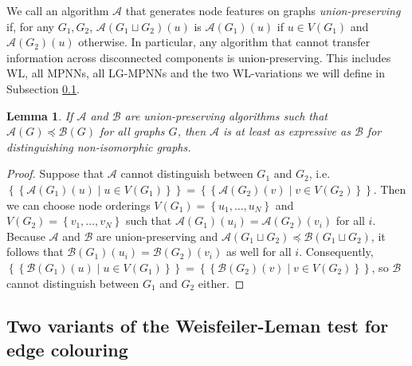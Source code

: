 \documentclass{article}
\newtheorem{lemma}[theorem]{Lemma}
\newcommand{\set}[1]{\left\{#1\right\}}
\newcommand{\multiset}[1]{\left\{\!\!\left\{#1\right\}\!\!\right\}}
\newcommand{\mca}{\mathcal{A}}
\newcommand{\mcb}{\mathcal{B}}
\begin{document}
We call an algorithm $\mca$ that generates node features on graphs \emph{union-preserving} if, for any $G_1,G_2$, $\mca(G_1 \sqcup G_2)(u)$ is $\mca(G_1)(u)$ if $u\in V(G_1)$ and $\mca(G_2)(u)$ otherwise.
In particular, any algorithm that cannot transfer information across disconnected components is union-preserving. This includes WL, all MPNNs, all LG-MPNNs and the two WL-variations we will define in Subsection \ref{ssec:wl-variations}.

\begin{lemma}   \label{lemma:refinement-distinguishability}
    If $\mca$ and $\mcb$ are union-preserving algorithms such that $\mca(G) \preceq \mcb(G)$ for all graphs $G$, then $\mca$ is at least as expressive as $\mcb$ for distinguishing non-isomorphic graphs.
\end{lemma}

\begin{proof}
    Suppose that $\mca$ cannot distinguish between $G_1$ and $G_2$, i.e. $\multiset{\mca(G_1)(u) \mid u\in V(G_1)} = \multiset{\mca(G_2)(v) \mid v\in V(G_2)}$. Then we can choose node orderings $V(G_1)=\set{u_1,\dots,u_N}$ and $V(G_2)=\set{v_1,\dots,v_N}$ such that $\mca(G_1)(u_i)=\mca(G_2)(v_i)$ for all $i$. Because $\mca$ and $\mcb$ are union-preserving and $\mca(G_1 \sqcup G_2) \preceq \mcb(G_1 \sqcup G_2)$, it follows that $\mcb(G_1)(u_i)=\mcb(G_2)(v_i)$ as well for all $i$. Consequently, $\multiset{\mcb(G_1)(u) \mid u\in V(G_1)} = \multiset{\mcb(G_2)(v) \mid v\in V(G_2)}$, so $\mcb$ cannot distinguish between $G_1$ and $G_2$ either.
\end{proof}


\subsection{Two variants of the Weisfeiler-Leman test for edge colouring}   \label{ssec:wl-variations}
\end{document}
